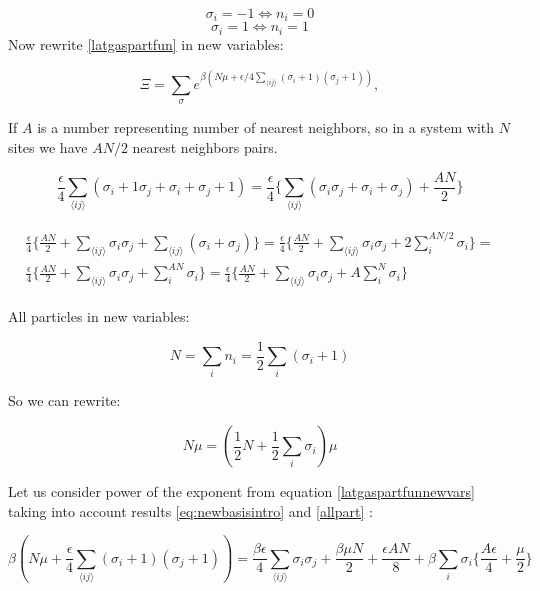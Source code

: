 \documentclass[10pt]{article}
\begin{document}
\[
\sigma_i = -1 \Leftrightarrow n_i = 0
\]
\[
\sigma_i = 1 \Leftrightarrow n_i = 1
\]
Now rewrite \ref{latgaspartfun} in new variables:

\begin{equation}\label{latgaspartfunnewvars}
\Xi =\sum_{\sigma}e^{\beta(N\mu + \epsilon/4 \sum_{\langle ij\rangle }(\sigma_i+1)(\sigma_j+1))},
\end{equation}

If $A$ is a number representing number of nearest neighbors, so in a system with $N$ sites we have $AN/2$ nearest neighbors pairs.

\begin{equation}\label{secondtermpower}
\frac{\epsilon}{4} \sum_{\langle ij\rangle }(\sigma_i+1\sigma_j + \sigma_i + \sigma_j + 1) = \frac{\epsilon}{4} \Bigg\{\sum_{\langle ij\rangle }(\sigma_i\sigma_j + \sigma_i + \sigma_j) + \frac{AN}{2}\Bigg\}
\end{equation}

\begin{align}
\begin{split}
\frac{\epsilon}{4} \Bigg\{\frac{AN}{2} + \sum_{\langle ij\rangle }\sigma_i\sigma_j +  \sum_{\langle ij\rangle }(\sigma_i + \sigma_j)\Bigg\} = \frac{\epsilon}{4} \Bigg\{\frac{AN}{2} + \sum_{\langle ij\rangle }\sigma_i\sigma_j +  2\sum_{i}^{AN/2}\sigma_i\Bigg\} = \\
\frac{\epsilon}{4} \Bigg\{\frac{AN}{2} + \sum_{\langle ij\rangle }\sigma_i\sigma_j +  \sum_{i}^{AN}\sigma_i\Bigg\} = \frac{\epsilon}{4} \Bigg\{\frac{AN}{2} + \sum_{\langle ij\rangle }\sigma_i\sigma_j +  A\sum_{i}^{N}\sigma_i\Bigg\}
\label{eq:newbasisintro}
\end{split}
\end{align}

All particles in new variables:

\[
N = \sum_{i}n_i = \frac{1}{2} \sum_{i} (\sigma_i + 1)
\]

So we can rewrite:

\begin{equation}\label{allpart}
N\mu = (\frac{1}{2}N + \frac{1}{2}\sum_{i} \sigma_i)\mu
\end{equation}

Let us consider power of the exponent from equation \ref{latgaspartfunnewvars} taking into account results \ref{eq:newbasisintro} and \ref{allpart} :

\begin{equation}
\beta(N\mu + \frac{\epsilon}{4} \sum_{\langle ij\rangle }(\sigma_i+1)(\sigma_j+1)) = \frac {\beta \epsilon}{4} \sum_{\langle ij\rangle }\sigma_i\sigma_j + \frac {\beta \mu N}{2} + \frac {\epsilon AN}{8} + \beta \sum_{i}\sigma_i\Bigg\{\frac{A\epsilon}{4} + \frac{\mu}{2} \Bigg\}
\end{equation}
\end{document}
